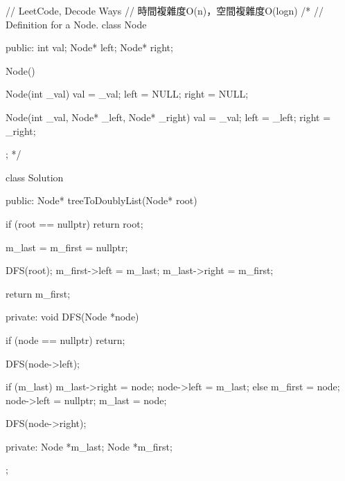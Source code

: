 \begin{Code}
// LeetCode, Decode Ways
// 時間複雜度O(n)，空間複雜度O(logn)
/*
// Definition for a Node.
class Node {
public:
    int val;
    Node* left;
    Node* right;

    Node() {}

    Node(int _val) {
        val = _val;
        left = NULL;
        right = NULL;
    }

    Node(int _val, Node* _left, Node* _right) {
        val = _val;
        left = _left;
        right = _right;
    }
};
*/

class Solution {
public:
    Node* treeToDoublyList(Node* root) {
        if (root == nullptr) return root;

        m_last = m_first = nullptr;

        DFS(root);
        m_first->left = m_last;
        m_last->right = m_first;

        return m_first;
    }
private:
    void DFS(Node *node)
    {
        if (node == nullptr) return;

        DFS(node->left);

        if (m_last)
        {
            m_last->right = node;
            node->left = m_last;
        }
        else
        {
            m_first = node;
            node->left = nullptr;
        }
        m_last = node;

        DFS(node->right);
    }
private:
    Node *m_last;
    Node *m_first;
};
\end{Code}
